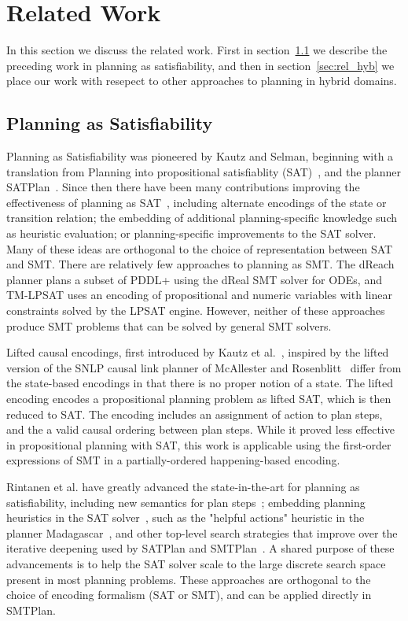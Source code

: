 \section{Related Work}\label{sec:related_work}

In this section we discuss the related work. First in section~\ref{sec:rel_sat} we describe the preceding work in planning as satisfiability, and then in section~\ref{sec:rel_hyb} we place our work with resepect to other approaches to planning in hybrid domains.

\subsection{Planning as Satisfiability}\label{sec:rel_sat}

Planning as Satisfiability was pioneered by Kautz and Selman, beginning with a translation from Planning into propositional satisfiablity (SAT)~\cite{kau92}, and the planner SATPlan~\cite{kau06}. Since then there have been many contributions improving the effectiveness of planning as SAT~\cite{rintanen1999constructing, hua12}, including alternate encodings of the state or transition relation; the embedding of additional planning-specific knowledge such as heuristic evaluation; or planning-specific improvements to the SAT solver. Many of these ideas are orthogonal to the choice of representation between SAT and SMT.
%
There are relatively few approaches to planning as SMT. The dReach planner plans a subset of PDDL+ using the dReal SMT solver for ODEs, and {\sc TM-LPSAT} uses an encoding of propositional and numeric variables with linear constraints solved by the LPSAT engine. However, neither of these approaches produce SMT problems that can be solved by general SMT solvers.

Lifted causal encodings, first introduced by Kautz et al.~\cite{kau96a}, inspired by the lifted version of the SNLP causal link planner of McAllester and Rosenblitt~\cite{mca91} differ from the state-based encodings in that there is no proper notion of a state. The lifted encoding encodes a propositional planning problem as lifted SAT, which is then reduced to SAT. The encoding includes an assignment of action to plan steps, and the a valid causal ordering between plan steps. While it proved less effective in propositional planning with SAT, this work is applicable using the first-order expressions of SMT in a partially-ordered happening-based encoding.

Rintanen et al. have greatly advanced the state-in-the-art for planning as satisfiability, including new semantics for plan steps~\cite{rin06,rin17}; embedding planning heuristics in the SAT solver~\cite{rin10a}, such as the "helpful actions" heuristic in the planner Madagascar~\cite{rin10}, and other top-level search strategies that improve over the iterative deepening used by SATPlan and SMTPlan~\cite{rin04}. A shared purpose of these advancements is to help the SAT solver scale to the large discrete search space present in most planning problems. These approaches are orthogonal to the choice of encoding formalism (SAT or SMT), and can be applied directly in SMTPlan.

